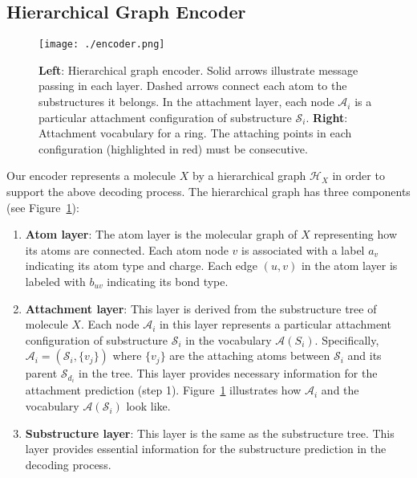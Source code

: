 \documentclass{article} \usepackage{iclr2020_conference,times}
\newcommand{\set}[1]{\{ #1 \}}
\def\gA{{\mathcal{A}}}
\def\gH{{\mathcal{H}}}
\def\gS{{\mathcal{S}}}
\begin{document}
\subsection{Hierarchical Graph Encoder}
\label{sec:encoder}
\begin{figure}
    \centering
    \texttt{[image: ./encoder.png]}
    \caption{\textbf{Left}: Hierarchical graph encoder. Solid arrows illustrate message passing in each layer. Dashed arrows connect each atom to the substructures it belongs. In the attachment layer, each node $\gA_i$ is a particular attachment configuration of substructure $\gS_i$. \textbf{Right}: Attachment vocabulary for a ring. The attaching points in each configuration (highlighted in red) must be consecutive.} \label{fig:encoder}
    \vspace{-5pt}
\end{figure}

Our encoder represents a molecule $X$ by a hierarchical graph $\gH_X$ in order to support the above decoding process. The hierarchical graph has three components (see Figure~\ref{fig:encoder}):


\begin{enumerate}[leftmargin=*,topsep=0pt,itemsep=0pt] 
    \item \textbf{Atom layer}: The atom layer is the molecular graph of $X$ representing how its atoms are connected. Each atom node $v$ is associated with a label $a_v$ indicating its atom type and charge. Each edge $(u,v)$ in the atom layer is labeled with $b_{uv}$ indicating its bond type.
    
    \item \textbf{Attachment layer}: This layer is derived from the substructure tree of molecule $X$. Each node $\gA_i$ in this layer represents a particular attachment configuration of substructure $\gS_i$ in the vocabulary $\gA(S_i)$. Specifically, $\gA_i=(\gS_i,\set{v_j})$ where $\set{v_j}$ are the attaching atoms between $\gS_i$ and its parent $\gS_{d_i}$ in the tree. This layer provides necessary information for the attachment prediction (step 1). Figure~\ref{fig:encoder} illustrates how $\gA_i$ and the vocabulary $\gA(\gS_i)$ look like.
    
    \item \textbf{Substructure layer}: This layer is the same as the substructure tree. This layer provides essential information for the substructure prediction in the decoding process.
\end{enumerate}
\end{document}
